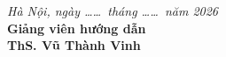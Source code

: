 \vspace{0.4cm}
\begin{flushright}
  \textit{Hà Nội, ngày \dots\dots\ tháng \dots\dots\ năm 2026}\\[4pt]
  \textbf{Giảng viên hướng dẫn}\\[1.8cm]
  \textbf{ThS. Vũ Thành Vinh}
\end{flushright}
